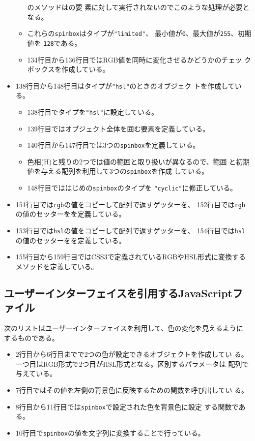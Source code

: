 \begin{itemize}
\begin{itemize}
							のメソッドはの要
							素に対して実行されないのでこのような処理が必要となる。
				\item これらの\texttt{spinbox}はタイプが\texttt{"limited"}、
							最小値が\texttt{0}、最大値が\texttt{255}、初期値を
							\texttt{128}である。
				\item 134行目から136行目ではRGB値を同時に変化させるかどうかのチェッ
							クボックスを作成している。
			 \end{itemize}
 \item 138行目から148行目はタイプが\texttt{"hsl"}のときのオブジェク
			 トを作成している。
			 \begin{itemize}
				\item 138行目でタイプを\texttt{"hsl"}に設定している。
				\item 139行目ではオブジェクト全体を囲む要素を定義している。
				\item 140行目から147行目では3つの\texttt{spinbox}を定義している。
				\item 色相(H)と残りの2つでは値の範囲と取り扱いが異なるので、範囲
							と初期値を与える配列を利用して3つの\texttt{spinbox}を作成
							している。
				\item 148行目でははじめの\texttt{spinbox}のタイプを
							\texttt{"cyclic"}に修正している。
			 \end{itemize}
 \item 151行目では\texttt{rgb}の値をコピーして配列で返すゲッターを、
 152行目では\texttt{rgb}の値のセッターをを定義している。
 \item 153行目では\texttt{hsl}の値をコピーして配列で返すゲッターを、
 154行目では\texttt{hsl}の値のセッターをを定義している。
 \item 155行目から159行目ではCSS3で定義されているRGBやHSL形式に変換する
			 メソッドを定義している。
\end{itemize}
 \subsection{ユーザーインターフェイスを引用するJavaScriptファイル}
 次のリストはユーザーインターフェイスを利用して、色の変化を見えるように
 するものである。
 \begin{itemize}
	\item 2行目から6行目までで2つの色が設定できるオブジェクトを作成してい
				る。一つ目はRGB形式で2つ目がHSL形式となる。区別するパラメータは
				配列で与えている。
	\item 7行目ではその値を左側の背景色に反映するための関数を呼び出してい
				る。
	\item 8行目から11行目では\texttt{spinbox}で設定された色を背景色に設定
				する関数である。
	\item 10行目で\texttt{spinbox}の値を文字列に変換することで行っている。
 \end{itemize}